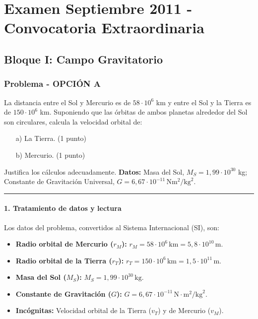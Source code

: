 \chapter{Examen Septiembre 2011 - Convocatoria Extraordinaria}
\label{chap:2011_sep_ext}

\section{Bloque I: Campo Gravitatorio}
\label{sec:grav_2011_sep_ext}

\subsection{Problema  - OPCIÓN A}
\label{subsec:1A_2011_sep_ext}

\begin{cajaenunciado}
La distancia entre el Sol y Mercurio es de $58\cdot10^{6}$ km y entre el Sol y la Tierra es de $150\cdot10^{6}$ km. Suponiendo que las órbitas de ambos planetas alrededor del Sol son circulares, calcula la velocidad orbital de:
\begin{enumerate}
    \item[a)] La Tierra. (1 punto)
    \item[b)] Mercurio. (1 punto)
\end{enumerate}
Justifica los cálculos adecuadamente.
\textbf{Datos:} Masa del Sol, $M_S = 1,99 \cdot 10^{30}$ kg; Constante de Gravitación Universal, $G=6,67\cdot10^{-11}\,\text{N}\text{m}^2/\text{kg}^2$.
\end{cajaenunciado}
\hrule

\subsubsection*{1. Tratamiento de datos y lectura}
Los datos del problema, convertidos al Sistema Internacional (SI), son:
\begin{itemize}
    \item \textbf{Radio orbital de Mercurio ($r_M$):} $r_M = 58 \cdot 10^6 \, \text{km} = 5,8 \cdot 10^{10} \, \text{m}$.
    \item \textbf{Radio orbital de la Tierra ($r_T$):} $r_T = 150 \cdot 10^6 \, \text{km} = 1,5 \cdot 10^{11} \, \text{m}$.
    \item \textbf{Masa del Sol ($M_S$):} $M_S = 1,99 \cdot 10^{30} \, \text{kg}$.
    \item \textbf{Constante de Gravitación ($G$):} $G = 6,67 \cdot 10^{-11} \, \text{N}\cdot\text{m}^2/\text{kg}^2$.
    \item \textbf{Incógnitas:} Velocidad orbital de la Tierra ($v_T$) y de Mercurio ($v_M$).
\end{itemize}

